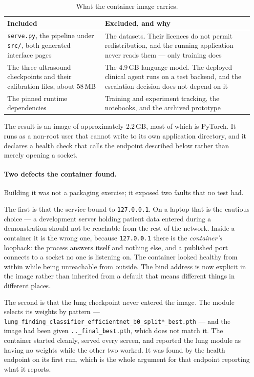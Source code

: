 \begin{table}[H]
  \centering
  \small
  \begin{tabularx}{\linewidth}{lX}
    \toprule
    \textbf{Included} & \textbf{Excluded, and why} \\
    \midrule
    \texttt{serve.py}, the pipeline under \texttt{src/}, both generated interface pages &
      The datasets. Their licences do not permit redistribution, and the running application
      never reads them --- only training does \\
    \addlinespace[2pt]
    The three ultrasound checkpoints and their calibration files, about 58\,MB &
      The 4.9\,GB language model. The deployed clinical agent runs on a test backend, and the
      escalation decision does not depend on it \\
    \addlinespace[2pt]
    The pinned runtime dependencies &
      Training and experiment tracking, the notebooks, and the archived prototype \\
    \bottomrule
  \end{tabularx}
  \caption{What the container image carries.}
  \label{tab:image-contents}
\end{table}

The result is an image of approximately 2.2\,GB, most of which is PyTorch. It runs as a
non-root user that cannot write to its own application directory, and it declares a health
check that calls the endpoint described below rather than merely opening a socket.

\paragraph{Two defects the container found.} Building it was not a packaging exercise; it
exposed two faults that no test had.

The first is that the service bound to \texttt{127.0.0.1}. On a laptop that is the cautious
choice --- a development server holding patient data entered during a demonstration should not
be reachable from the rest of the network. Inside a container it is the wrong one, because
\texttt{127.0.0.1} there is the \emph{container's} loopback: the process answers itself and
nothing else, and a published port connects to a socket no one is listening on. The container
looked healthy from within while being unreachable from outside. The bind address is now
explicit in the image rather than inherited from a default that means different things in
different places.

The second is that the lung checkpoint never entered the image. The module selects its weights
by pattern --- \texttt{lung\_finding\_classifier\_efficientnet\_b0\_split*\_best.pth} --- and
the image had been given \texttt{..\_final\_best.pth}, which does not match it. The container
started cleanly, served every screen, and reported the lung module as having no weights while
the other two worked. It was found by the health endpoint on its first run, which is the whole
argument for that endpoint reporting what it reports.

